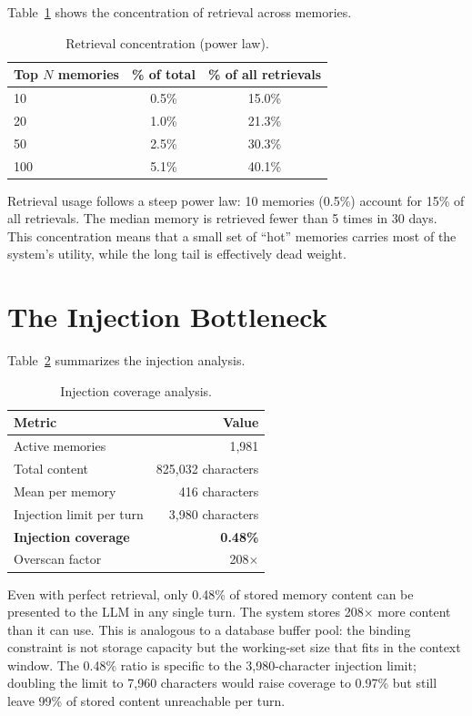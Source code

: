 \documentclass[10pt,twocolumn]{article}
\begin{document}
Table~\ref{tab:powerlaw} shows the concentration of retrieval across memories.

\begin{table}[h]
\centering
\caption{Retrieval concentration (power law).}
\label{tab:powerlaw}
\begin{tabular}{lcc}
\toprule
Top $N$ memories & \% of total & \% of all retrievals \\
\midrule
10 & 0.5\% & 15.0\% \\
20 & 1.0\% & 21.3\% \\
50 & 2.5\% & 30.3\% \\
100 & 5.1\% & 40.1\% \\
\bottomrule
\end{tabular}
\end{table}

Retrieval usage follows a steep power law: 10 memories (0.5\%) account for 15\% of all retrievals. The median memory is retrieved fewer than 5 times in 30 days. This concentration means that a small set of ``hot'' memories carries most of the system's utility, while the long tail is effectively dead weight.

\section{The Injection Bottleneck}
\label{sec:injection}

Table~\ref{tab:injection} summarizes the injection analysis.

\begin{table}[h]
\centering
\caption{Injection coverage analysis.}
\label{tab:injection}
\begin{tabular}{lr}
\toprule
Metric & Value \\
\midrule
Active memories & 1,981 \\
Total content & 825,032 characters \\
Mean per memory & 416 characters \\
Injection limit per turn & 3,980 characters \\
\textbf{Injection coverage} & \textbf{0.48\%} \\
Overscan factor & 208$\times$ \\
\bottomrule
\end{tabular}
\end{table}

Even with perfect retrieval, only 0.48\% of stored memory content can be presented to the LLM in any single turn. The system stores 208$\times$ more content than it can use. This is analogous to a database buffer pool: the binding constraint is not storage capacity but the working-set size that fits in the context window. The 0.48\% ratio is specific to the 3,980-character injection limit; doubling the limit to 7,960 characters would raise coverage to 0.97\% but still leave 99\% of stored content unreachable per turn.
\end{document}
